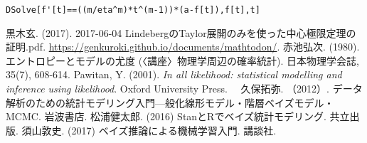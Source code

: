 \documentclass[a4paper, 12pt]{jarticle}
\begin{document}
\verb|DSolve[f'[t]==((m/eta^m)*t^(m-1))*(a-f[t]),f[t],t]|

\begin{thebibliography}{4}
黒木玄. (2017). 2017-06-04 LindebergのTaylor展開のみを使った中心極限定理の証明.pdf. \url{https://genkuroki.github.io/documents/mathtodon/}.
 赤池弘次. (1980). エントロピーとモデルの尤度 (〈講座〉物理学周辺の確率統計). 日本物理学会誌, 35(7), 608-614.
 Pawitan, Y. (2001). \textit{In all likelihood: statistical modelling and inference using likelihood}. Oxford University Press.
　久保拓弥. （2012）. データ解析のための統計モデリング入門---般化線形モデル・階層ベイズモデル・MCMC. 岩波書店.
 松浦健太郎. (2016) StanとRでベイズ統計モデリング. 共立出版.
 須山敦史. (2017) ベイズ推論による機械学習入門. 講談社.
\end{thebibliography}
\end{document}
